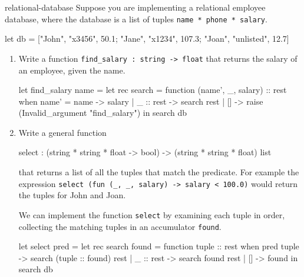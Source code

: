 %
\begin{exercise}{relational-database}
Suppose you are implementing a relational employee database, where the database is
a list of tuples \hbox{\lstinline/name * phone * salary/}.

\begin{ocaml}
let db =
   ["John", "x3456", 50.1;
    "Jane", "x1234", 107.3;
    "Joan", "unlisted", 12.7]
\end{ocaml}

\begin{enumerate}
\item Write a function \hbox{\lstinline/find_salary : string -> float/} that returns the salary
of an employee, given the name.

\begin{answer}\ifanswers
\begin{ocaml}
let find_salary name =
   let rec search = function
       (name', _, salary) :: rest when name' = name -> salary
     | _ :: rest -> search rest
     | [] -> raise (Invalid_argument "find_salary")
   in
      search db
\end{ocaml}
\fi\end{answer}


\item Write a general function
%
\begin{ocaml}
select : (string * string * float -> bool) -> (string * string * float) list
\end{ocaml}
that returns a list of all the tuples that match the predicate.  For example the expression
\hbox{\lstinline/select (fun (_, _, salary) -> salary < 100.0)/} would return the tuples for John
and Joan.

\begin{answer}\ifanswers
We can implement the function \hbox{\lstinline/select/} by examining each tuple in order, collecting the
matching tuples in an accumulator \hbox{\lstinline/found/}.
\begin{ocaml}
let select pred =
   let rec search found = function
      tuple :: rest when pred tuple ->
          search (tuple :: found) rest
    | _ :: rest -> search found rest
    | [] -> found
   in
       search db
\end{ocaml}
\fi\end{answer}
\end{enumerate}
\end{exercise}

